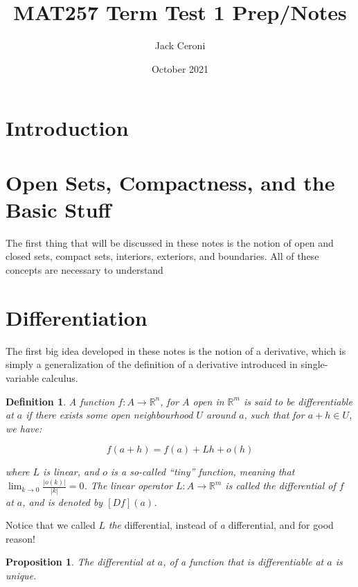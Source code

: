 \documentclass[10pt, oneside]{amsart}
\title{MAT257 Term Test 1 Prep/Notes}
\author{Jack Ceroni}
\date{October 2021}
\newtheorem{defn}{Definition}
\newtheorem{prop}{Proposition}
\begin{document}
    \maketitle

    \tableofcontents

    \vspace{.25in}

    \newpage

    \section{Introduction}

    \section{Open Sets, Compactness, and the Basic Stuff}

    The first thing that will be discussed in these notes is the notion of open and closed sets, compact sets, interiors, exteriors, and boundaries. All of these concepts are necessary to understand 

    \section{Differentiation}

    The first big idea developed in these notes is the notion of a derivative, which is simply a generalization of the definition of a derivative introduced in single-variable calculus.

    \begin{defn}
      A function $f : A \rightarrow \mathbb{R}^{n}$, for $A$ open in $\mathbb{R}^{m}$ is said to be differentiable at $a$ if there exists some open neighbourhood $U$ around $a$, such that for $a + h \in U$, we have:

      $$f(a + h) = f(a) + L h + o(h)$$

      where $L$ is linear, and $o$ is a so-called ``tiny'' function, meaning that $\lim_{k \to 0} \frac{|o(k)|}{|k|} = 0$. The linear operator $L : A \rightarrow \mathbb{R}^{m}$ is called the \textit{differential} of $f$ at $a$, and
      is denoted by $[Df](a)$.
    \end{defn}

    Notice that we called $L$ \textit{the} differential, instead of \textit{a} differential, and for good reason!

    \begin{prop}
      The differential at $a$, of a function that is differentiable at $a$ is unique.
    \end{prop}
\end{document}
